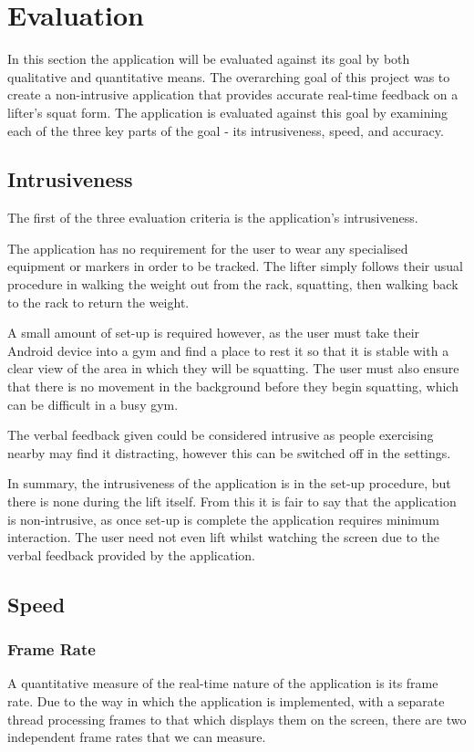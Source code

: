 \chapter{Evaluation}

In this section the application will be evaluated against its goal by both qualitative and quantitative means. The overarching goal of this project was to create a non-intrusive application that provides accurate real-time feedback on a lifter's squat form. The application is evaluated against this goal by examining each of the three key parts of the goal - its intrusiveness, speed, and accuracy.

\section{Intrusiveness}
The first of the three evaluation criteria is the application's intrusiveness. 

The application has no requirement for the user to wear any specialised equipment or markers in order to be tracked. The lifter simply follows their usual procedure in walking the weight out from the rack, squatting, then walking back to the rack to return the weight.

A small amount of set-up is required however, as the user must take their Android device into a gym and find a place to rest it so that it is stable with a clear view of the area in which they will be squatting. The user must also ensure that there is no movement in the background before they begin squatting, which can be difficult in a busy gym.

The verbal feedback given could be considered intrusive as people exercising nearby may find it distracting, however this can be switched off in the settings.

In summary, the intrusiveness of the application is in the set-up procedure, but there is none during the lift itself. From this it is fair to say that the application is non-intrusive, as once set-up is complete the application requires minimum interaction. The user need not even lift whilst watching the screen due to the verbal feedback provided by the application.

\section{Speed}

\subsection{Frame Rate}
A quantitative measure of the real-time nature of the application is its frame rate. Due to the way in which the application is implemented, with a separate thread processing frames to that which displays them on the screen, there are two independent frame rates that we can measure.

